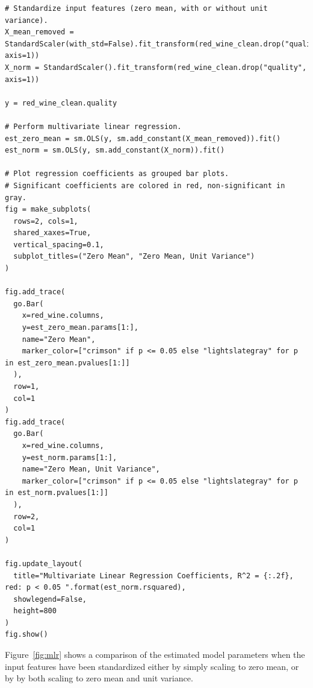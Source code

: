 \documentclass[12pt]{article}
\begin{document}
  \begin{lstlisting}[caption={Multivariate linear regression of the quality
    score against all input features.}, captionpos=b, label={lst:mlr}]
# Standardize input features (zero mean, with or without unit variance).
X_mean_removed = StandardScaler(with_std=False).fit_transform(red_wine_clean.drop("quality", axis=1))
X_norm = StandardScaler().fit_transform(red_wine_clean.drop("quality", axis=1))

y = red_wine_clean.quality

# Perform multivariate linear regression.
est_zero_mean = sm.OLS(y, sm.add_constant(X_mean_removed)).fit()
est_norm = sm.OLS(y, sm.add_constant(X_norm)).fit()

# Plot regression coefficients as grouped bar plots.
# Significant coefficients are colored in red, non-significant in gray.
fig = make_subplots(
  rows=2, cols=1, 
  shared_xaxes=True, 
  vertical_spacing=0.1,
  subplot_titles=("Zero Mean", "Zero Mean, Unit Variance")
)

fig.add_trace(
  go.Bar(
    x=red_wine.columns,
    y=est_zero_mean.params[1:],
    name="Zero Mean",
    marker_color=["crimson" if p <= 0.05 else "lightslategray" for p in est_zero_mean.pvalues[1:]]
  ),
  row=1,
  col=1
)
fig.add_trace(
  go.Bar(
    x=red_wine.columns,
    y=est_norm.params[1:],
    name="Zero Mean, Unit Variance",
    marker_color=["crimson" if p <= 0.05 else "lightslategray" for p in est_norm.pvalues[1:]]
  ),
  row=2,
  col=1
)

fig.update_layout(
  title="Multivariate Linear Regression Coefficients, R^2 = {:.2f}, red: p < 0.05 ".format(est_norm.rsquared),
  showlegend=False,
  height=800
)
fig.show()
  \end{lstlisting}

  Figure~\ref{fig:mlr} shows a comparison of the estimated model parameters
  when the input features have been standardized either by simply scaling to
  zero mean, or by by both scaling to zero mean and unit variance.
\end{document}
